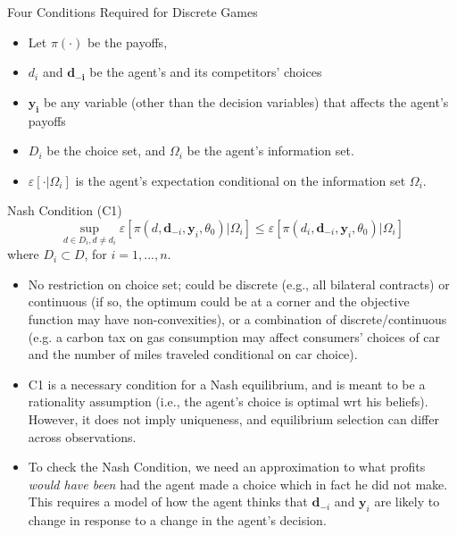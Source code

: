 \begin{frame}{Four Conditions Required for Discrete Games}
\begin{itemize}
\item Let $\pi(\cdot)$ be the payoffs, 
\item $d_i$ and $\mathbf{d_{-i}}$ be the agent's and its competitors' choices
\item $\mathbf{y_i}$ be any variable (other than the decision variables) that affects the agent's payoffs
\item $D_i$ be the choice set, and $\Omega_i$ be the agent's information set.  
\item \large{$\varepsilon[ \cdot | \Omega_i]$} \normalsize is the agent's expectation conditional on the information set $\Omega_i$.
\end{itemize}
\end{frame}


\begin{frame}{Nash Condition (C1)}
\begin{equation*}
\sup_{d\in D_{i},d\neq d_{i}}\varepsilon\left[ \pi (d,\mathbf{d}_{-i},\mathbf{y}_{i},\theta _{0})|\Omega_i \right] \leq \varepsilon\left[ \pi (d_{i},\mathbf{d}_{-i},\mathbf{y}_{i},\theta _{0})| \Omega_i \right] 
\end{equation*}
where $D_{i}\subset D$, for $i=1,...,n$.
\begin{itemize}
\footnotesize
\item No restriction on choice set; could be discrete (e.g., all bilateral
contracts) or continuous (if so, the optimum could be at a corner and the objective function may
have non-convexities), or a combination of discrete/continuous (e.g. a carbon tax on gas consumption may affect consumers' choices of car and the number of miles
traveled conditional on car choice).
\item C1 is a necessary condition for a Nash equilibrium, and is meant to be a rationality assumption (i.e., the agent's choice is optimal wrt his beliefs).  However, it does not imply uniqueness, and equilibrium selection can differ across observations.
\item To check the Nash Condition, we need an approximation to what profits \textit{%
would have been} had the agent made a choice which in fact he did not make.
This requires a model of how the agent thinks that $\mathbf{d}_{-i}$ and $%
\mathbf{y}_{i}$ are likely to change in response to a change in the agent's
decision. 
\end{itemize}
\end{frame}

